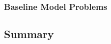 \documentclass{stdlocal}
\begin{document}
    \subsubsection*{Baseline Model Problems} %
    \label{ssub:baseline_model_problems}


  \subsection{Summary} %
  \label{sub:summary}

\end{document}
